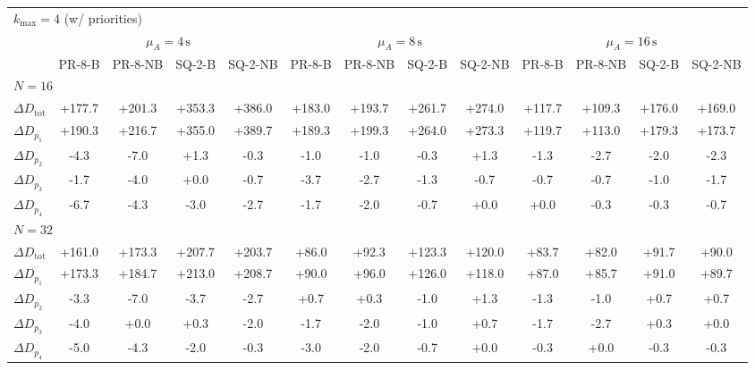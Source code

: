 \begin{tabular}{l c c c c c c c c c c c c}
\toprule
\multicolumn{13}{l}{$k_{\max}=4$ (w/ priorities)} \\
\addlinespace[0.2em]
 & \multicolumn{4}{c}{$\mu_A=4\,\mathrm{s}$} & \multicolumn{4}{c}{$\mu_A=8\,\mathrm{s}$} & \multicolumn{4}{c}{$\mu_A=16\,\mathrm{s}$} \\
\cmidrule(lr){2-5}\cmidrule(lr){6-9}\cmidrule(lr){10-13}
 & PR-8-B & PR-8-NB & SQ-2-B & SQ-2-NB & PR-8-B & PR-8-NB & SQ-2-B & SQ-2-NB & PR-8-B & PR-8-NB & SQ-2-B & SQ-2-NB \\
\midrule
\multicolumn{13}{l}{${N=16}$} \\
\midrule
$\Delta D_{\mathrm{tot}}$ & +177.7 & +201.3 & +353.3 & +386.0 & +183.0 & +193.7 & +261.7 & +274.0 & +117.7 & +109.3 & +176.0 & +169.0 \\
$\Delta D_{p_1}$ & +190.3 & +216.7 & +355.0 & +389.7 & +189.3 & +199.3 & +264.0 & +273.3 & +119.7 & +113.0 & +179.3 & +173.7 \\
$\Delta D_{p_2}$ & -4.3 & -7.0 & +1.3 & -0.3 & -1.0 & -1.0 & -0.3 & +1.3 & -1.3 & -2.7 & -2.0 & -2.3 \\
$\Delta D_{p_3}$ & -1.7 & -4.0 & +0.0 & -0.7 & -3.7 & -2.7 & -1.3 & -0.7 & -0.7 & -0.7 & -1.0 & -1.7 \\
$\Delta D_{p_4}$ & -6.7 & -4.3 & -3.0 & -2.7 & -1.7 & -2.0 & -0.7 & +0.0 & +0.0 & -0.3 & -0.3 & -0.7 \\
\midrule
\multicolumn{13}{l}{${N=32}$} \\
\midrule
$\Delta D_{\mathrm{tot}}$ & +161.0 & +173.3 & +207.7 & +203.7 & +86.0 & +92.3 & +123.3 & +120.0 & +83.7 & +82.0 & +91.7 & +90.0 \\
$\Delta D_{p_1}$ & +173.3 & +184.7 & +213.0 & +208.7 & +90.0 & +96.0 & +126.0 & +118.0 & +87.0 & +85.7 & +91.0 & +89.7 \\
$\Delta D_{p_2}$ & -3.3 & -7.0 & -3.7 & -2.7 & +0.7 & +0.3 & -1.0 & +1.3 & -1.3 & -1.0 & +0.7 & +0.7 \\
$\Delta D_{p_3}$ & -4.0 & +0.0 & +0.3 & -2.0 & -1.7 & -2.0 & -1.0 & +0.7 & -1.7 & -2.7 & +0.3 & +0.0 \\
$\Delta D_{p_4}$ & -5.0 & -4.3 & -2.0 & -0.3 & -3.0 & -2.0 & -0.7 & +0.0 & -0.3 & +0.0 & -0.3 & -0.3 \\
\bottomrule
\end{tabular}
